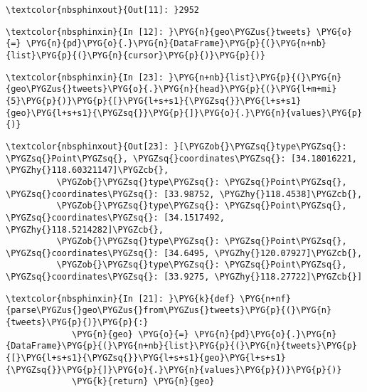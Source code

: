 \documentclass[letterpaper,10pt,english]{sphinxmanual}
\begin{document}
%
\begin{Verbatim}[commandchars=\\\{\}]
\textcolor{nbsphinxout}{Out[11]: }2952
\end{Verbatim}

%
\begin{Verbatim}[commandchars=\\\{\}]
\textcolor{nbsphinxin}{In [12]: }\PYG{n}{geo\PYGZus{}tweets} \PYG{o}{=} \PYG{n}{pd}\PYG{o}{.}\PYG{n}{DataFrame}\PYG{p}{(}\PYG{n+nb}{list}\PYG{p}{(}\PYG{n}{cursor}\PYG{p}{)}\PYG{p}{)}
\end{Verbatim}

%
\begin{Verbatim}[commandchars=\\\{\}]
\textcolor{nbsphinxin}{In [23]: }\PYG{n+nb}{list}\PYG{p}{(}\PYG{n}{geo\PYGZus{}tweets}\PYG{o}{.}\PYG{n}{head}\PYG{p}{(}\PYG{l+m+mi}{5}\PYG{p}{)}\PYG{p}{[}\PYG{l+s+s1}{\PYGZsq{}}\PYG{l+s+s1}{geo}\PYG{l+s+s1}{\PYGZsq{}}\PYG{p}{]}\PYG{o}{.}\PYG{n}{values}\PYG{p}{)}
\end{Verbatim}

%
\begin{Verbatim}[commandchars=\\\{\}]
\textcolor{nbsphinxout}{Out[23]: }[\PYGZob{}\PYGZsq{}type\PYGZsq{}: \PYGZsq{}Point\PYGZsq{}, \PYGZsq{}coordinates\PYGZsq{}: [34.18016221, \PYGZhy{}118.60321147]\PYGZcb{},
          \PYGZob{}\PYGZsq{}type\PYGZsq{}: \PYGZsq{}Point\PYGZsq{}, \PYGZsq{}coordinates\PYGZsq{}: [33.98752, \PYGZhy{}118.4538]\PYGZcb{},
          \PYGZob{}\PYGZsq{}type\PYGZsq{}: \PYGZsq{}Point\PYGZsq{}, \PYGZsq{}coordinates\PYGZsq{}: [34.1517492, \PYGZhy{}118.5214282]\PYGZcb{},
          \PYGZob{}\PYGZsq{}type\PYGZsq{}: \PYGZsq{}Point\PYGZsq{}, \PYGZsq{}coordinates\PYGZsq{}: [34.6495, \PYGZhy{}120.07927]\PYGZcb{},
          \PYGZob{}\PYGZsq{}type\PYGZsq{}: \PYGZsq{}Point\PYGZsq{}, \PYGZsq{}coordinates\PYGZsq{}: [33.9275, \PYGZhy{}118.27722]\PYGZcb{}]
\end{Verbatim}

%
\begin{Verbatim}[commandchars=\\\{\}]
\textcolor{nbsphinxin}{In [21]: }\PYG{k}{def} \PYG{n+nf}{parse\PYGZus{}geo\PYGZus{}from\PYGZus{}tweets}\PYG{p}{(}\PYG{n}{tweets}\PYG{p}{)}\PYG{p}{:}
             \PYG{n}{geo} \PYG{o}{=} \PYG{n}{pd}\PYG{o}{.}\PYG{n}{DataFrame}\PYG{p}{(}\PYG{n+nb}{list}\PYG{p}{(}\PYG{n}{tweets}\PYG{p}{[}\PYG{l+s+s1}{\PYGZsq{}}\PYG{l+s+s1}{geo}\PYG{l+s+s1}{\PYGZsq{}}\PYG{p}{]}\PYG{o}{.}\PYG{n}{values}\PYG{p}{)}\PYG{p}{)}
             \PYG{k}{return} \PYG{n}{geo}
\end{Verbatim}
\end{document}
